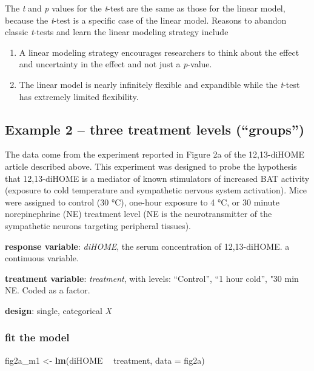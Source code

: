 \documentclass[]{book}
\newenvironment{Shaded}{\begin{snugshade}}{\end{snugshade}}
\newcommand{\DataTypeTok}[1]{\textcolor[rgb]{0.13,0.29,0.53}{#1}}
\newcommand{\KeywordTok}[1]{\textcolor[rgb]{0.13,0.29,0.53}{\textbf{#1}}}
\newcommand{\NormalTok}[1]{#1}
\newcommand{\OperatorTok}[1]{\textcolor[rgb]{0.81,0.36,0.00}{\textbf{#1}}}
\newcommand{\StringTok}[1]{\textcolor[rgb]{0.31,0.60,0.02}{#1}}
\providecommand{\tightlist}{%
  \setlength{\itemsep}{0pt}\setlength{\parskip}{0pt}}
\begin{document}
The \emph{t} and \emph{p} values for the \emph{t}-test are the same as those for the linear model, because the \emph{t}-test is a specific case of the linear model. Reasons to abandon classic \emph{t}-tests and learn the linear modeling strategy include

\begin{enumerate}
\def\labelenumi{\arabic{enumi}.}
\tightlist
\item
  A linear modeling strategy encourages researchers to think about the effect and uncertainty in the effect and not just a \emph{p}-value.
\item
  The linear model is nearly infinitely flexible and expandible while the \emph{t}-test has extremely limited flexibility.
\end{enumerate}

\hypertarget{example-2-three-treatment-levels-groups}{%
\subsection{Example 2 -- three treatment levels (``groups'')}\label{example-2-three-treatment-levels-groups}}

The data come from the experiment reported in Figure 2a of the 12,13-diHOME article described above. This experiment was designed to probe the hypothesis that 12,13-diHOME is a mediator of known stimulators of increased BAT activity (exposure to cold temperature and sympathetic nervous system activation). Mice were assigned to control (30 °C), one-hour exposure to 4 °C, or 30 minute norepinephrine (NE) treatment level (NE is the neurotransmitter of the sympathetic neurons targeting peripheral tissues).

\textbf{response variable}: \emph{diHOME}, the serum concentration of 12,13-diHOME. a continuous variable.

\textbf{treatment variable}: \emph{treatment}, with levels: ``Control'', ``1 hour cold'', "30 min NE. Coded as a factor.

\textbf{design}: single, categorical \emph{X}

\hypertarget{fit-the-model}{%
\subsubsection{fit the model}\label{fit-the-model}}

\begin{Shaded}
\begin{Highlighting}[]
\NormalTok{fig2a_m1 <-}\StringTok{ }\KeywordTok{lm}\NormalTok{(diHOME }\OperatorTok{~}\StringTok{ }\NormalTok{treatment, }\DataTypeTok{data =}\NormalTok{ fig2a)}
\end{Highlighting}
\end{Shaded}
\end{document}
